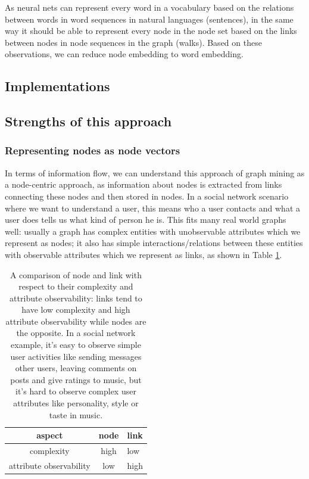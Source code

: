 \documentclass{article}
\begin{document}
As neural nets can represent every word in a vocabulary based on the relations between words in word sequences in natural languages (sentences), in the same way it should be able to represent every node in the node set based on the links between nodes in node sequences in the graph (walks). Based on these observations, we can reduce node embedding to word embedding.

\subsection{Implementations}

\subsection{Strengths of this approach}

\subsubsection{Representing nodes as node vectors}
In terms of information flow, we can understand this approach of graph mining as a node-centric approach, as information about nodes is extracted from links connecting these nodes and then stored in nodes. In a social network scenario where we want to understand a user, this means who a user contacts and what a user does tells us what kind of person he is. This fits many real world graphs well: usually a graph has complex entities with unobservable attributes which we represent as nodes; it also has simple interactions/relations between these entities with observable attributes which we represent as links, as shown in Table \ref{tab:nodes_vs_links}.

\begin{table}[h]
	\centering
	\begin{tabularx}{0.5\textwidth}{ |c|c|X| } \hline
		aspect  & node & link \\ \hline
		complexity & high & low \\ \hline
		attribute observability & low & high \\ \hline
	\end{tabularx}
	\caption{A comparison of node and link with respect to their complexity and attribute observability: links tend to have low complexity and high attribute observability while nodes are the opposite. In a social network example, it's easy to observe simple user activities like sending messages other users, leaving comments on posts and give ratings to music, but it's hard to observe complex user attributes like personality, style or taste in music.}
	\label{tab:nodes_vs_links}
\end{table}
\end{document}
